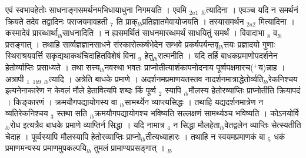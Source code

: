 \documentclass[article,12pt,a4paper]{memoir}%
\newcommand{\add}[1]{($^{+}$#1)}
\newcounter{parCount}
\begin{document}
	  
	  \pstart \leavevmode%
	\hphantom{.}एवं स्वभावहेतोः साधनाङ्गसमर्थनमभिधायाधुना निगमयति । {\color{DodgerBlue3}एवमि} {\tiny $_{2a1}$} {\tiny $_{lb}$}त्यादिना । एवञ्च यदि न समर्थनं क्रियते तदेव तद्वादिनः पराजयमावहती {\tiny $_{7}$} ति प्राक्{\tiny $_{lb}$}प्रतिज्ञातमेवायोजयति । {\color{DodgerBlue3}तस्यासमर्थन} {\tiny $_{2a2}$} मित्यादिना । कस्मादेवं प्रारब्धार्था{\tiny $_{lb}$}साधनादिति । न ह्यसमर्थितं साधनमारब्धमर्थं साधयितुं समर्थं । विवादाभा {\tiny $_{8}$} \leavevmode{} व{\tiny $_{lb}$}प्रसङ्गात् । तथाहि सार्व्वज्ञज्ञानसाधने संस्कारोत्कर्षभेदेन सम्भवे प्रकर्षपर्यन्तवृ{\tiny $_{lb}$}त्तयः प्रज्ञादयो गुणाः स्थिराश्रयवर्त्ति सकृद्यथाकथंचिदाहितविशेषं विना {\tiny $_{9}$} हेतु{\tiny $_{lb}$}रात्मनीति । यदि तर्हि बाधकप्रमाणोपदर्शनेन हेतोर्व्याप्तिः प्रसाध्यते । तथा सत्त्य{\tiny $_{lb}$}नवस्था भवतः प्राप्नोतीत्याशंकापनोदनाय पूर्व्वपक्षमारच\add{य}न्नाह । {\color{DodgerBlue3}अत्रापी} {\tiny $_{1}$} {\tiny $_{1b9}$} {\tiny $_{lb}$}त्यादि । अत्रेति बाधके प्रमाणे । अदर्शनमप्रमाणयतस्तव नादर्शनमात्राद्धेतोर्व्यति{\tiny $_{lb}$}रेकनिश्चय इत्यनेनाकारेण न केवलं मौले हेतावित्यपि शब्दः किं पूर्व्व {\tiny $_{2}$} स्यापि {\tiny $_{lb}$}मौलस्य हेतोरव्याप्तिः प्राप्नोतीति क्रियापदं । किङ्कारणं । क्रमयौगपद्यायोगस्य वा {\tiny $_{lb}$}सामर्थ्येन व्याप्त्यसिद्धः । तथाहि यद्यदर्शनमात्रेण न व्यतिरेकनिश्चय {\tiny $_{3}$} स्तथा सति {\tiny $_{lb}$}क्रमयौगपद्यायोगश्च भविष्यति सल्लक्षणं सामर्थ्यञ्च भविष्यति । कोऽनयोर्वि{\tiny $_{lb}$}रोध इत्यत्रैव बाधके प्रमाणे व्याप्तिर्न सिद्धा । यदि नामात्र {\tiny $_{4}$} न सिद्धा मौलहेता{\tiny $_{lb}$}वेतद्वलेन व्याप्तिः सेत्स्यतीति चेदाह । पूर्व्वस्यापि मौलस्यापि हेतोरव्याप्तिः प्राप्नो{\tiny $_{lb}$}तीत्यध्याहारः । तथाहि न स्वयमप्रमाणकं बा {\tiny $_{5}$} धकं प्रमाणमन्यस्य प्रमाणमुपकल्पयि{\tiny $_{lb}$} \leavevmode{} तुमलं प्रामाण्यप्रसङ्गात् ।
	{}
	\pend%
      {\tiny $_{lb}$}
\end{document}
